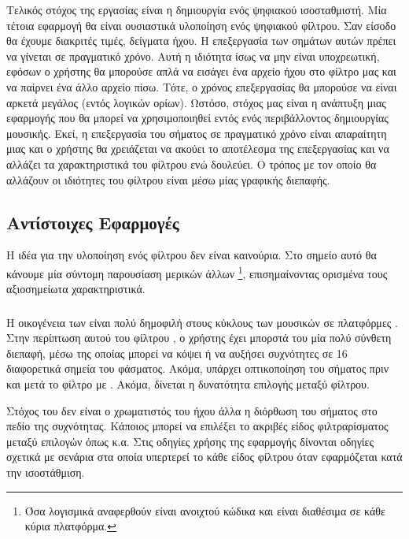 \documentclass[12pt]{extarticle}
\begin{document}
Τελικός στόχος της εργασίας είναι η δημιουργία ενός ψηφιακού ισοσταθμιστή. 
Μία τέτοια εφαρμογή θα είναι ουσιαστικά υλοποίηση ενός ψηφιακού φίλτρου. 
Σαν είσοδο θα έχουμε διακριτές τιμές, δείγματα ήχου. 
Η επεξεργασία των σημάτων αυτών πρέπει να γίνεται σε πραγματικό χρόνο. 
Αυτή η ιδιότητα ίσως να μην είναι υποχρεωτική, εφόσων ο χρήστης 
θα μπορούσε απλά να εισάγει ένα αρχείο ήχου στο φίλτρο μας και να παίρνει ένα 
άλλο αρχείο πίσω. Τότε, ο χρόνος επεξεργασίας θα μπορούσε να είναι αρκετά 
μεγάλος (εντός λογικών ορίων). 
Ωστόσο, στόχος μας είναι η ανάπτυξη μιας εφαρμογής που θα μπορεί να χρησιμοποιηθεί 
εντός ενός περιβάλλοντος δημιουργίας μουσικής. Εκεί, η επεξεργασία του σήματος σε πραγματικό 
χρόνο είναι απαραίτητη μιας και ο χρήστης θα χρειάζεται να ακούει το αποτέλεσμα της επεξεργασίας
και να αλλάζει τα χαρακτηριστικά του φίλτρου ενώ δουλεύει.
Ο τρόπος με τον οποίο θα αλλάζουν οι ιδιότητες του φίλτρου είναι μέσω μίας γραφικής διεπαφής. 

\subsection{Αντίστοιχες Εφαρμογές}

Η ιδέα για την υλοποίηση ενός φίλτρου δεν είναι καινούρια. 
Στο σημείο αυτό θα κάνουμε μία σύντομη 
παρουσίαση μερικών άλλων  \footnote{
Όσα λογισμικά αναφερθούν είναι ανοιχτού κώδικα και είναι διαθέσιμα σε κάθε κύρια πλατφόρμα.
}, επισημαίνοντας ορισμένα τους 
αξιοσημείωτα χαρακτηριστικά.


\subsubsection{}

Η οικογένεια  των  είναι 
πολύ δημοφιλή στους κύκλους των μουσικών σε πλατφόρμες . 
Στην περίπτωση αυτού του φίλτρου \cite{LSPEQ}, ο χρήστης έχει μπορστά του μία 
πολύ σύνθετη διεπαφή, μέσω της οποίας μπορεί να κόψει ή να αυξήσει συχνότητες σε 
16 διαφορετικά σημεία του φάσματος.
Ακόμα, υπάρχει οπτικοποίηση του σήματος
πριν και μετά το φίλτρο με . Ακόμα, δίνεται 
η δυνατότητα επιλογής μεταξύ  φίλτρου.

Στόχος του  δεν είναι ο χρωματιστός του ήχου άλλα 
η διόρθωση του σήματος στο πεδίο της συχνότητας. Κάποιος μπορεί 
να επιλέξει το ακριβές είδος φιλτραρίσματος μεταξύ επιλογών 
όπως  κ.α.
Στις οδηγίες χρήσης της εφαρμογής δίνονται οδηγίες σχετικά με σενάρια στα οποία υπερτερεί το κάθε 
είδος φίλτρου όταν εφαρμόζεται κατά την ισοστάθμιση.
\end{document}
